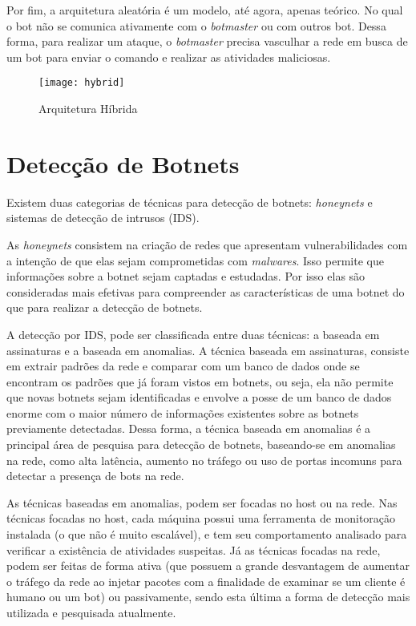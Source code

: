 Por fim, a arquitetura aleatória é um modelo, até agora, apenas teórico. No qual o bot não se comunica ativamente com o \textit{botmaster} ou com outros bot. Dessa forma, para realizar um ataque, o \textit{botmaster} precisa vasculhar a rede em busca de um bot para enviar o comando e realizar as atividades maliciosas.

\begin{figure}
\texttt{[image: hybrid]}
\caption[Arquitetura Híbrida]{Arquitetura Híbrida\cite{wang2010advanced}} \label{fig:hybrid_architecture}
\end{figure}

\section{Detecção de Botnets}

Existem duas categorias de técnicas para detecção de botnets: \textit{honeynets} e sistemas de detecção de intrusos (IDS). 

As \textit{honeynets} consistem na criação de redes que apresentam vulnerabilidades com a intenção de que elas sejam comprometidas com \textit{malwares}. Isso permite que informações sobre a botnet sejam captadas e estudadas. Por isso elas são consideradas mais efetivas para compreender as características de uma botnet do que para realizar a detecção de botnets.

A detecção por IDS, pode ser classificada entre duas técnicas: a baseada em assinaturas e a baseada em anomalias. A técnica baseada em assinaturas, consiste em extrair padrões da rede e comparar com um banco de dados onde se encontram os padrões que já foram vistos em botnets, ou seja, ela não permite que novas botnets sejam identificadas e envolve a posse de um banco de dados enorme com o maior número de informações existentes sobre as botnets previamente detectadas. Dessa forma, a técnica baseada em anomalias é a principal área de pesquisa para detecção de botnets, baseando-se em anomalias na rede, como alta latência, aumento no tráfego ou uso de portas incomuns para detectar a presença de bots na rede.

As técnicas baseadas em anomalias, podem ser focadas no host ou na rede. Nas técnicas focadas no host, cada máquina possui uma ferramenta de monitoração instalada (o que não é muito escalável), e tem seu comportamento analisado para verificar a existência de atividades suspeitas. Já as técnicas focadas na rede, podem ser feitas de forma ativa (que possuem a grande desvantagem de aumentar o tráfego da rede ao injetar pacotes com a finalidade de examinar se um cliente é humano ou um bot) ou passivamente, sendo esta última a forma de detecção mais utilizada e pesquisada atualmente.

